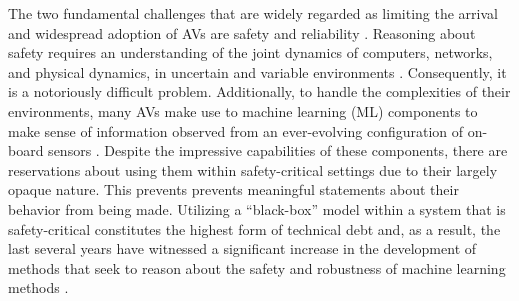 \documentclass[manuscript,screen,review]{acmart}
\begin{document}
The two fundamental challenges that are widely regarded as limiting the arrival and widespread adoption of AVs are safety and reliability \cite{Majumdar2017}. Reasoning about safety requires an understanding of the joint dynamics of computers, networks, and physical dynamics, in uncertain and variable environments \cite{Yurtsever2019}. Consequently, it is a notoriously difficult problem. Additionally, to handle the complexities of their environments, many AVs make use to machine learning (ML) components to make sense of information observed from an ever-evolving configuration of on-board sensors \cite{Yurtsever2019}. Despite the impressive capabilities of these components, there are reservations about using them within safety-critical settings due to their largely opaque nature. This prevents prevents meaningful statements about their behavior from being made. Utilizing a ``black-box'' model within a system that is safety-critical constitutes the highest form of technical debt \cite{Sculley2015} and, as a result, the last several years have witnessed a significant increase in the development of methods that seek to reason about the safety and robustness of machine learning methods \cite{VariationalMIT2018,Liu2019,xiang20118survey}.







\end{document}

